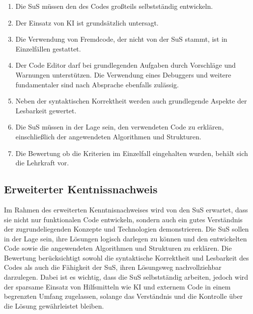 \documentclass[a4paper,12pt]{article}
\begin{document}
\begin{enumerate}[label=\S\ \arabic*]
    \item Die SuS müssen den des Codes großteils selbstständig entwickeln.
    \item Der Einsatz von KI ist grundsätzlich untersagt.
    \item Die Verwendung von Fremdcode, der nicht von der SuS stammt, ist in Einzelfällen  gestattet.
    \item Der Code Editor darf bei grundlegenden Aufgaben durch Vorschläge und Warnungen unterstützen. Die Verwendung eines Debuggers und weitere fundamentaler sind nach Absprache ebenfalls zulässig.
    \item Neben der syntaktischen Korrektheit werden auch grundlegende Aspekte der Lesbarkeit gewertet.
    \item Die SuS müssen in der Lage sein, den verwendeten Code zu erklären, einschließlich der angewendeten Algorithmen und Strukturen.
    \item Die Bewertung ob die Kriterien im Einzelfall eingehalten wurden, behält sich die Lehrkraft vor.
\end{enumerate}


\subsection{Erweiterter Kentnissnachweis}
Im Rahmen des erweiterten Kenntnisnachweises wird von den SuS erwartet, dass sie nicht nur funktionalen Code entwickeln, sondern auch ein gutes Verständnis der zugrundeliegenden Konzepte und Technologien demonstrieren. Die SuS sollen in der Lage sein, ihre Lösungen logisch darlegen zu können und den entwickelten Code sowie die angewendeten Algorithmen und Strukturen zu erklären. Die Bewertung berücksichtigt sowohl die syntaktische Korrektheit und Lesbarkeit des Codes als auch die Fähigkeit der SuS, ihren Lösungsweg nachvollziehbar darzulegen. Dabei ist es wichtig, dass die SuS selbstständig arbeiten, jedoch wird der sparsame Einsatz von Hilfsmitteln wie KI und externem Code in einem begrenzten Umfang zugelassen, solange das Verständnis und die Kontrolle über die Lösung gewährleistet bleiben.
\end{document}
